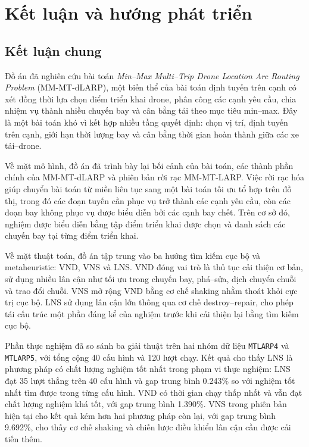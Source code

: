 \chapter{Kết luận và hướng phát triển}
\label{chap:ket-luan}

\section{Kết luận chung}
\label{sec:conclusion-summary}

Đồ án đã nghiên cứu bài toán \textit{Min--Max Multi--Trip Drone Location Arc Routing Problem} (MM-MT-dLARP), một biến thể của bài toán định tuyến trên cạnh có xét đồng thời lựa chọn điểm triển khai drone, phân công các cạnh yêu cầu, chia nhiệm vụ thành nhiều chuyến bay và cân bằng tải theo mục tiêu min--max. Đây là một bài toán khó vì kết hợp nhiều tầng quyết định: chọn vị trí, định tuyến trên cạnh, giới hạn thời lượng bay và cân bằng thời gian hoàn thành giữa các xe tải--drone.

Về mặt mô hình, đồ án đã trình bày lại bối cảnh của bài toán, các thành phần chính của MM-MT-dLARP và phiên bản rời rạc MM-MT-LARP. Việc rời rạc hóa giúp chuyển bài toán từ miền liên tục sang một bài toán tối ưu tổ hợp trên đồ thị, trong đó các đoạn tuyến cần phục vụ trở thành các cạnh yêu cầu, còn các đoạn bay không phục vụ được biểu diễn bởi các cạnh bay chết. Trên cơ sở đó, nghiệm được biểu diễn bằng tập điểm triển khai được chọn và danh sách các chuyến bay tại từng điểm triển khai.

Về mặt thuật toán, đồ án tập trung vào ba hướng tìm kiếm cục bộ và metaheuristic: VND, VNS và LNS. VND đóng vai trò là thủ tục cải thiện cơ bản, sử dụng nhiều lân cận như tối ưu trong chuyến bay, phá--sửa, dịch chuyển chuỗi và trao đổi chuỗi. VNS mở rộng VND bằng cơ chế shaking nhằm thoát khỏi cực trị cục bộ. LNS sử dụng lân cận lớn thông qua cơ chế destroy--repair, cho phép tái cấu trúc một phần đáng kể của nghiệm trước khi cải thiện lại bằng tìm kiếm cục bộ.

Phần thực nghiệm đã so sánh ba giải thuật trên hai nhóm dữ liệu \texttt{MTLARP4} và \texttt{MTLARP5}, với tổng cộng 40 cấu hình và 120 lượt chạy. Kết quả cho thấy LNS là phương pháp có chất lượng nghiệm tốt nhất trong phạm vi thực nghiệm: LNS đạt 35 lượt thắng trên 40 cấu hình và gap trung bình 0.243\% so với nghiệm tốt nhất tìm được trong từng cấu hình. VND có thời gian chạy thấp nhất và vẫn đạt chất lượng nghiệm khá tốt, với gap trung bình 1.390\%. VNS trong phiên bản hiện tại cho kết quả kém hơn hai phương pháp còn lại, với gap trung bình 9.692\%, cho thấy cơ chế shaking và chiến lược điều khiển lân cận cần được cải tiến thêm.

